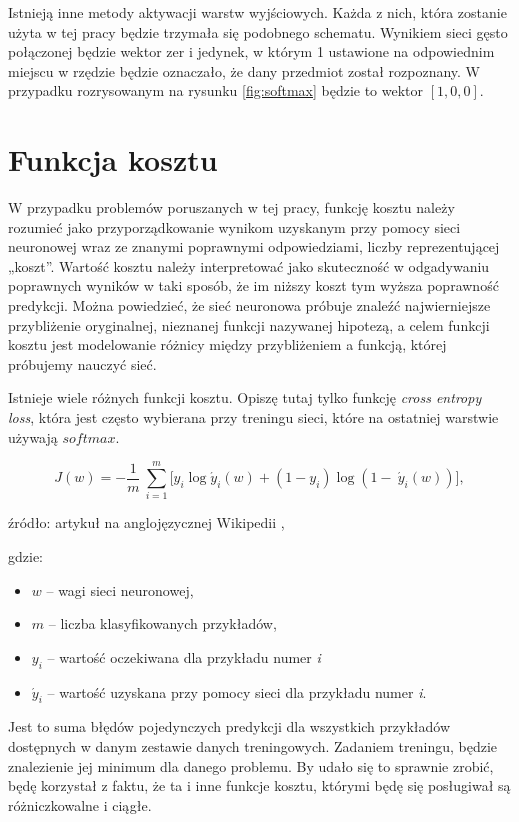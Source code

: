 Istnieją inne metody aktywacji warstw wyjściowych. Każda z nich, która zostanie użyta w tej pracy będzie trzymała się podobnego schematu. Wynikiem sieci gęsto połączonej będzie wektor zer i jedynek, w którym 1 ustawione na odpowiednim miejscu w rzędzie będzie oznaczało, że dany przedmiot został rozpoznany. W przypadku rozrysowanym na rysunku \ref{fig:softmax} będzie to wektor \([1, 0, 0]\).

\section{Funkcja kosztu}
\label{sec:costfunction}

W przypadku problemów poruszanych w tej pracy, funkcję kosztu należy rozumieć jako przyporządkowanie wynikom uzyskanym przy pomocy sieci neuronowej wraz ze znanymi poprawnymi odpowiedziami, liczby reprezentującej „koszt”. Wartość kosztu należy interpretować jako skuteczność w odgadywaniu poprawnych wyników w taki sposób, że im niższy koszt tym wyższa poprawność predykcji. Można powiedzieć, że sieć neuronowa próbuje znaleźć najwierniejsze przybliżenie oryginalnej, nieznanej funkcji nazywanej hipotezą, a celem funkcji kosztu jest modelowanie różnicy między przybliżeniem a funkcją, której próbujemy nauczyć sieć.

Istnieje wiele różnych funkcji kosztu. Opiszę tutaj tylko funkcję \textit{cross entropy loss}, która jest często wybierana przy treningu sieci, które na ostatniej warstwie używają \(softmax\).

\[J(w) = - \frac{1}{m}\ \sum_{i = 1}^{m}{\lbrack y_{i}\log{\acute{y}_{i}(w) + \left( 1 - y_{i} \right)\log{(1 - \ \acute{y}_{i}(w))}}\rbrack}, \tag{4}\]

źródło: artykuł na anglojęzycznej Wikipedii \cite{wikicrs},

gdzie:

\begin{itemize}
\item
  \(w\) -- wagi sieci neuronowej,
\item
  \(m\) -- liczba klasyfikowanych przykładów,
\item
    \(y_{i}\) -- wartość oczekiwana dla przykładu numer \textit{i}
\item
    \(\acute{y}_{i}\) -- wartość uzyskana przy pomocy sieci dla przykładu numer \textit{i}.
\end{itemize}

Jest to suma błędów pojedynczych predykcji dla wszystkich przykładów dostępnych w danym zestawie danych treningowych. Zadaniem treningu, będzie znalezienie jej minimum dla danego problemu.
By udało się to sprawnie zrobić, będę korzystał z faktu, że ta i inne funkcje kosztu, którymi będę się posługiwał są różniczkowalne i ciągłe.

